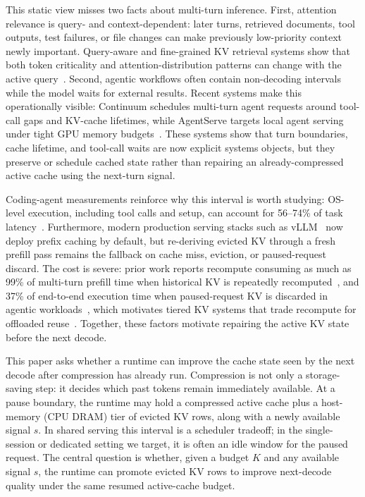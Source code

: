 \documentclass{article}
\begin{document}
This static view misses two facts about multi-turn inference.
First, attention relevance is query- and context-dependent: later turns,
retrieved documents, tool outputs, test failures, or file changes can make
previously low-priority context newly important.
Query-aware and fine-grained KV retrieval systems show that both token
criticality and attention-distribution patterns can change with the active
query~\citep{quest,fier}.
Second, agentic workflows often contain non-decoding intervals while the
model waits for external results.
Recent systems make this operationally visible: Continuum schedules
multi-turn agent requests around tool-call gaps and KV-cache lifetimes,
while AgentServe targets local agent serving under tight GPU memory
budgets~\citep{continuum,agentserve}.
These systems show that turn boundaries, cache lifetime, and tool-call waits
are now explicit systems objects, but they preserve or schedule cached state
rather than repairing an already-compressed active cache using the next-turn
signal.

Coding-agent measurements reinforce why this interval is worth studying:
OS-level execution, including tool calls and setup, can account for
56--74\% of task latency~\citep{agentcgroup}.
Furthermore, modern production serving stacks such as
vLLM~\citep{vllm} now deploy prefix caching by default, but re-deriving
evicted KV through a fresh prefill pass remains the fallback on cache
miss, eviction, or paused-request discard.
The cost is severe: prior work reports recompute consuming as much as
99\% of multi-turn prefill time when historical KV is repeatedly
recomputed~\citep{cachedattention}, and 37\% of end-to-end execution
time when paused-request KV is discarded in agentic
workloads~\citep{infercept}, which motivates tiered KV systems that trade
recompute for offloaded reuse~\citep{lmcache,ttkv}.
Together, these factors motivate repairing the active KV state before the next decode.

This paper asks whether a runtime can improve the cache state seen by the
next decode after compression has already run.
Compression is not only a storage-saving step: it decides which past tokens
remain immediately available.
At a pause boundary, the runtime may hold a compressed active cache plus
a host-memory (CPU DRAM) tier of evicted KV rows,
along with a newly available signal $s$.
In shared serving this interval is a scheduler tradeoff; in the
single-session or dedicated setting we target, it is often an idle window for
the paused request.
The central question is whether, given a budget $K$ and any available signal
$s$, the runtime can promote evicted KV rows to improve next-decode quality
under the same resumed active-cache budget.
\end{document}
